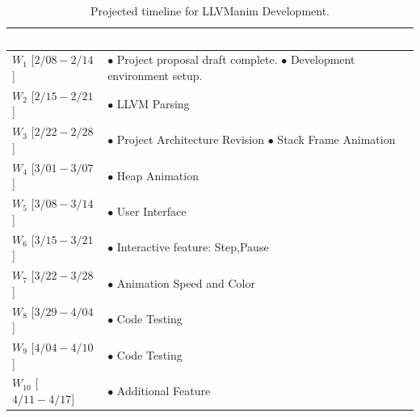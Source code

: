 
\begin{table}[htbp]
\centering
\renewcommand{\arraystretch}{1.5}
\begin{tabularx}{\columnwidth}{|>{\centering\arraybackslash}m{2.5cm}|>{\raggedright\arraybackslash}X|}
\hline
\rowcolor[HTML]{4472C4}
\textcolor{white}{\textbf{Week}} & \textcolor{white}{\textbf{Task}} \\ \hline
$W_1$    [$2/08 - 2/14$] & $\bullet$ Project proposal draft complete.\newline
                           $\bullet$ Development environment setup. \\ \hline
$W_2$    [$2/15 - 2/21$] & $\bullet$ LLVM Parsing \\ \hline
$W_3$    [$2/22 - 2/28$] & $\bullet$ Project Architecture Revision\newline
                           $\bullet$ Stack Frame Animation \\ \hline
$W_4$    [$3/01 - 3/07$] & $\bullet$ Heap Animation \\ \hline
$W_5$    [$3/08 - 3/14$] & $\bullet$ User Interface\\ \hline
$W_6$    [$3/15 - 3/21$] & $\bullet$ Interactive feature: Step,Pause \\ \hline
$W_7$    [$3/22 - 3/28$] & $\bullet$ Animation Speed and Color \\ \hline
$W_8$    [$3/29 - 4/04$] & $\bullet$ Code Testing \\ \hline
$W_9$    [$4/04 - 4/10$] & $\bullet$ Code Testing\\ \hline
$W_{10}$ [$4/11 - 4/17$] & $\bullet$ Additional Feature\\ \hline
\end{tabularx}
\vspace{0.1cm}
\caption{Projected timeline for LLVManim Development.}
\end{table}
